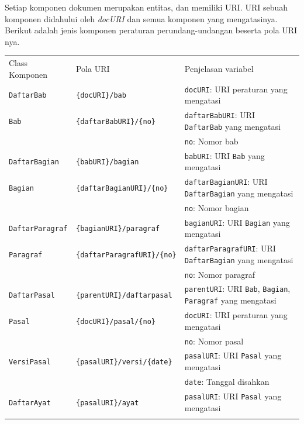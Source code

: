 Setiap komponen dokumen merupakan entitas, dan memiliki URI. URI sebuah
komponen didahului oleh \emph{docURI} dan semua komponen yang
mengatasinya. Berikut adalah jenis komponen peraturan perundang-undangan
beserta pola URI nya.

\begin{longtable}[c]{@{}lll@{}}
\toprule\addlinespace
Class Komponen & Pola URI & Penjelasan variabel
\\\addlinespace
\midrule\endhead
\texttt{DaftarBab} & \texttt{\{docURI\}/bab} & \texttt{docURI}: URI
peraturan yang mengatasi
\\\addlinespace
\texttt{Bab} & \texttt{\{daftarBabURI\}/\{no\}} & \texttt{daftarBabURI}:
URI \texttt{DaftarBab} yang mengatasi
\\\addlinespace
& & \texttt{no}: Nomor bab
\\\addlinespace
\texttt{DaftarBagian} & \texttt{\{babURI\}/bagian} & \texttt{babURI}:
URI \texttt{Bab} yang mengatasi
\\\addlinespace
\texttt{Bagian} & \texttt{\{daftarBagianURI\}/\{no\}} &
\texttt{daftarBagianURI}: URI \texttt{DaftarBagian} yang mengatasi
\\\addlinespace
& & \texttt{no}: Nomor bagian
\\\addlinespace
\texttt{DaftarParagraf} & \texttt{\{bagianURI\}/paragraf} &
\texttt{bagianURI}: URI \texttt{Bagian} yang mengatasi
\\\addlinespace
\texttt{Paragraf} & \texttt{\{daftarParagrafURI\}/\{no\}} &
\texttt{daftarParagrafURI}: URI \texttt{DaftarBagian} yang mengatasi
\\\addlinespace
& & \texttt{no}: Nomor paragraf
\\\addlinespace
\texttt{DaftarPasal} & \texttt{\{parentURI\}/daftarpasal} &
\texttt{parentURI}: URI \texttt{Bab}, \texttt{Bagian}, \texttt{Paragraf}
yang mengatasi
\\\addlinespace
\texttt{Pasal} & \texttt{\{docURI\}/pasal/\{no\}} & \texttt{docURI}: URI
peraturan yang mengatasi
\\\addlinespace
& & \texttt{no}: Nomor pasal
\\\addlinespace
\texttt{VersiPasal} & \texttt{\{pasalURI\}/versi/\{date\}} &
\texttt{pasalURI}: URI \texttt{Pasal} yang mengatasi
\\\addlinespace
& & \texttt{date}: Tanggal disahkan
\\\addlinespace
\texttt{DaftarAyat} & \texttt{\{pasalURI\}/ayat} & \texttt{pasalURI}:
URI \texttt{Pasal} yang mengatasi
\\\addlinespace

\end{longtable}

